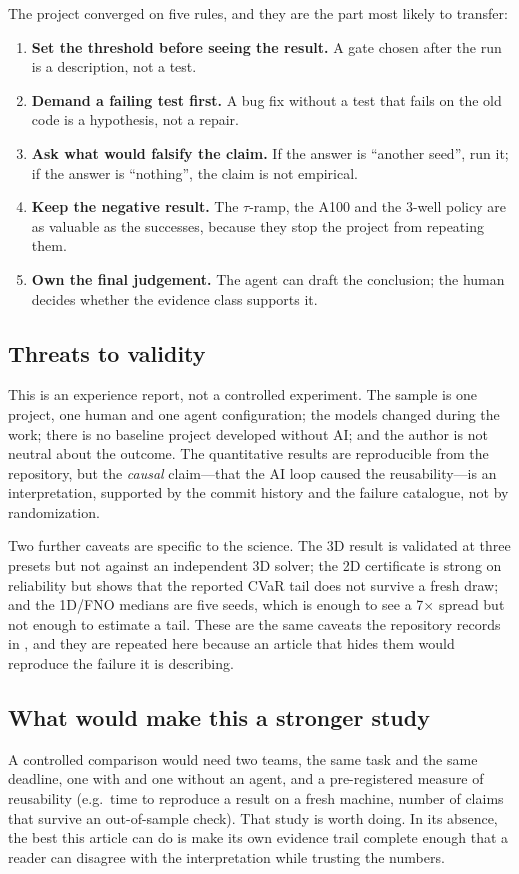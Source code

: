 The project converged on five rules, and they are the part most likely to
transfer:
\begin{enumerate}
  \item \textbf{Set the threshold before seeing the result.} A gate chosen after
        the run is a description, not a test.
  \item \textbf{Demand a failing test first.} A bug fix without a test that
        fails on the old code is a hypothesis, not a repair.
  \item \textbf{Ask what would falsify the claim.} If the answer is ``another
        seed'', run it; if the answer is ``nothing'', the claim is not
        empirical.
  \item \textbf{Keep the negative result.} The $\tau$-ramp, the A100 and the 3-well
        policy are as valuable as the successes, because they stop the project
        from repeating them.
  \item \textbf{Own the final judgement.} The agent can draft the conclusion;
        the human decides whether the evidence class supports it.
\end{enumerate}

\subsection{Threats to validity}
\label{sec:threats}

This is an experience report, not a controlled experiment. The sample is one
project, one human and one agent configuration; the models changed during the
work; there is no baseline project developed without AI; and the author is not
neutral about the outcome. The quantitative results are reproducible from the
repository, but the \emph{causal} claim---that the AI loop caused the
reusability---is an interpretation, supported by the commit history and the
failure catalogue, not by randomization.

Two further caveats are specific to the science. The 3D result is validated at
three presets but not against an independent 3D solver; the 2D certificate is
strong on reliability but shows that the reported CVaR tail does not survive a
fresh draw; and the 1D/FNO medians are five seeds, which is enough to see a 7$\times$
spread but not enough to estimate a tail. These are the same caveats the
repository records in , and they are repeated here because
an article that hides them would reproduce the failure it is describing.

\subsection{What would make this a stronger study}
\label{sec:future}

A controlled comparison would need two teams, the same task and the same
deadline, one with and one without an agent, and a pre-registered measure of
reusability (e.g.\ time to reproduce a result on a fresh machine, number of
claims that survive an out-of-sample check). That study is worth doing. In its
absence, the best this article can do is make its own evidence trail complete
enough that a reader can disagree with the interpretation while trusting the
numbers.
